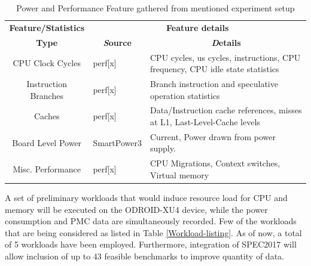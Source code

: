 \documentclass[conference]{IEEEtran}
\begin{document}
        \begin{table}[htbp]
            \caption{Power and Performance Feature gathered from mentioned experiment setup}
            \begin{center}
                \begin{tabular}{|c|p{1.5cm}|p{3.7cm}|}
                    \hline
                    \textbf{Feature/Statistics}&\multicolumn{2}{|c|}{\textbf{Feature details }} \\
                    \cline{2-3} 
                    \textbf{Type} & \multicolumn{1}{|c|}{\textbf{\textit Source}} & \multicolumn{1}{|c|}{\textbf{\textit Details}} \\
                    \hline
                    CPU Clock Cycles  & perf[x]  & CPU cycles, us cycles, instructions, CPU frequency, CPU idle state statistics \\
                    \hline
                    Instruction Branches  & perf[x]  & Branch instruction and speculative operation statistics \\
                    \hline
                    Caches   & perf[x]  & Data/Instruction cache references, misses at L1, Last-Level-Cache levels  \\
                    \hline
                    Board Level Power & SmartPower3\cite{odroid-smartpower3} & Current, Power drawn from power supply. \\
                    \hline
                    Misc. Performance  & perf[x]  & CPU Migrations, Context switches, Virtual memory \\
                    \hline
                \end{tabular}
                \label{Power-Perf-data-gathered}
            \end{center}
        \end{table}

        \par A set of preliminary workloads that would induce resource load for CPU and memory will be executed on the ODROID-XU4 device, while the power consumption and PMC data are simultaneously recorded. Few of the workloads that are being considered as listed in Table \ref{Workload-listing}. As of now, a total of 5 workloads have been employed. Furthermore, integration of SPEC2017 will allow inclusion of up to 43 feasible benchmarks to improve quantity of data.
\end{document}
